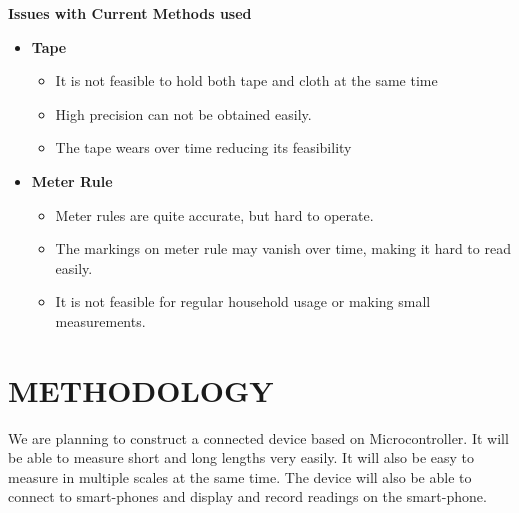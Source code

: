 \documentclass[12pt,a4paper]{article}
\begin{document}
{\fontsize{16pt}{24}\selectfont \textbf {Issues with Current Methods used} }\\

\begin{itemize}
  \item \textbf{Tape}
  \begin{itemize}
  	\item It is not feasible to hold both tape and cloth at the same time
	\item High precision can not be obtained easily.
	\item The tape wears over time reducing its feasibility
  \end{itemize}
  \item \textbf{Meter Rule}
  \begin{itemize}
  	\item Meter rules are quite accurate, but hard to operate.
	\item The markings on meter rule may vanish over time, making it hard to read easily. 
	\item It is not feasible for regular household usage or making small measurements.
  \end{itemize}
\end{itemize}


 \newpage
\section{\uppercase {Methodology}}

We are planning to construct a connected device based on Microcontroller. It will be able to measure short and long lengths very easily. It will also be easy to measure in multiple scales at the same time. The device will also be able to connect to smart-phones and display and record readings on the smart-phone. 
\end{document}
